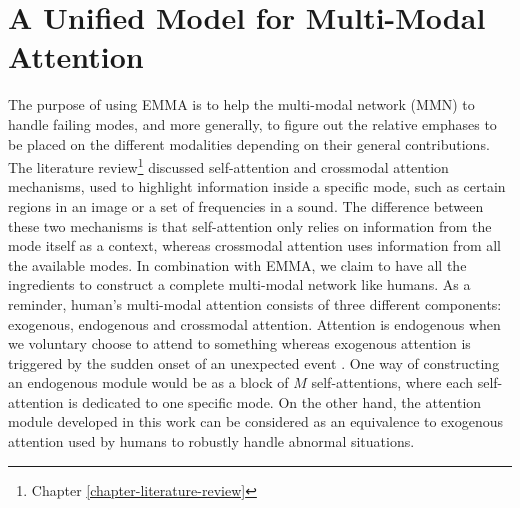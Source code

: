 \chapter{A Unified Model for Multi-Modal Attention} 
\label{chapter-unified} 

The purpose of using EMMA is to help the multi-modal network (MMN) to handle failing modes, and more generally, to figure out the relative emphases to be placed on the different modalities depending on their general contributions. The literature review\footnote{Chapter \ref{chapter-literature-review}} discussed self-attention and crossmodal attention mechanisms, used to highlight information inside a specific mode, such as certain regions in an image or a set of frequencies in a sound. The difference between these two mechanisms is that self-attention only relies on information from the mode itself as a context, whereas crossmodal attention uses information from all the available modes. In combination with EMMA, we claim to have all the ingredients to construct a complete multi-modal network like humans. As a reminder, human's multi-modal attention consists of three different components: exogenous, endogenous and crossmodal attention. Attention is endogenous when we voluntary choose to attend to something whereas exogenous attention is triggered by the sudden onset of an unexpected event \citep{crossmodal}. One way of constructing an endogenous module would be as a block of $M$ self-attentions, where each self-attention is dedicated to one specific mode. On the other hand, the attention module developed in this work can be considered as an equivalence to exogenous attention used by humans to robustly handle abnormal situations.

